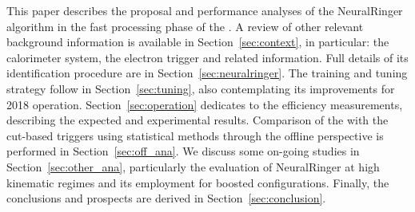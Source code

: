 

This paper describes the proposal and performance analyses of the NeuralRinger
algorithm in the fast processing phase of the \hlt{}. A review
of other relevant background information is available in
Section~\ref{sec:context}, in particular: the calorimeter system, the electron
trigger and related information. Full details of its identification procedure are
in Section~\ref{sec:neuralringer}. The training and tuning strategy follow in
Section~\ref{sec:tuning}, also contemplating its improvements for 2018
operation. Section~\ref{sec:operation} dedicates to the efficiency measurements,
describing the expected and experimental results. Comparison of the \rnn with
the cut-based triggers using statistical methods through the offline perspective
is performed in Section~\ref{sec:off_ana}. We discuss some on-going studies in
Section~\ref{sec:other_ana}, particularly the evaluation of NeuralRinger at high
kinematic regimes and its employment for boosted configurations. Finally,
the conclusions and prospects are derived in Section~\ref{sec:conclusion}.




